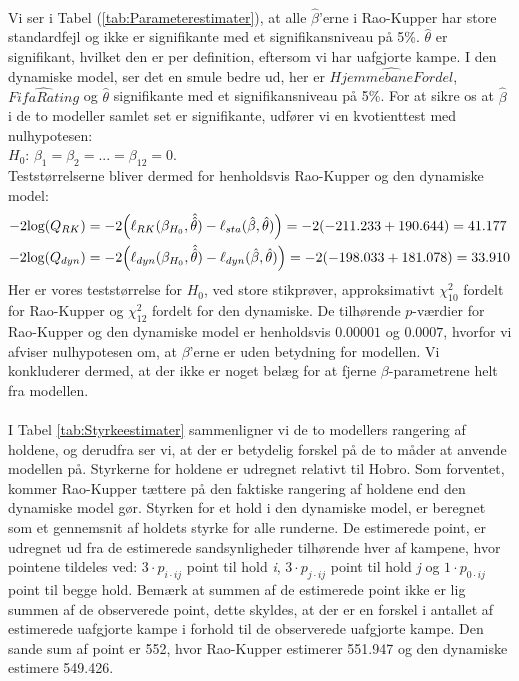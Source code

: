 \documentclass[11pt,a4paper]{article}
\begin{document}
\\Vi ser i Tabel (\ref{tab:Parameterestimater}), at alle $\hat{\beta}$'erne i Rao-Kupper har store standardfejl og ikke er signifikante med et signifikansniveau på 5\%. $\hat{\theta}$ er signifikant, hvilket den er per definition, eftersom vi har uafgjorte kampe. I den dynamiske model, ser det en smule bedre ud, her er $\hat{HjemmebaneFordel}$, $\hat{FifaRating}$ og $\hat{\theta}$ signifikante med et signifikansniveau på 5\%. For at sikre os at $\hat{\beta}$ i de to modeller samlet set er signifikante, udfører vi en kvotienttest med nulhypotesen:\\
$H_0$: $\beta_1=\beta_2=...=\beta_{12} = 0$.\\
Teststørrelserne bliver dermed for henholdsvis Rao-Kupper og den dynamiske model:\\
\begin{align*}
    -2\text{log}(Q_{RK})&=-2\Big{(}\ell_{RK} (\beta_{H_0}, \hat{\hat{\theta}})-\ell_{sta} (\hat{\beta},\hat{\theta})\Big{)}=-2(-211.233+190.644)=41.177\\
    -2\text{log}(Q_{dyn})&=-2\Big{(}\ell_{dyn} (\beta_{H_0},\hat{\hat{\theta}})-\ell_{dyn} (\hat{\beta},\hat{\theta})\Big{)}=-2(-198.033+181.078)=33.910
\end{align*}
Her er vores teststørrelse for $H_0$, ved store stikprøver, approksimativt $\chi^2_{10}$ fordelt for Rao-Kupper og $\chi^2_{12}$ fordelt for den dynamiske. De tilhørende $p$-værdier for Rao-Kupper og den dynamiske model er henholdsvis $0.00001$ og $0.0007$, hvorfor vi afviser nulhypotesen om, at $\beta$'erne er uden betydning for modellen. Vi konkluderer dermed, at der ikke er noget belæg for at fjerne $\beta$-parametrene helt fra modellen.
\\\\I Tabel \ref{tab:Styrkeestimater} sammenligner vi de to modellers rangering af holdene, og derudfra ser vi, at der er betydelig forskel på de to måder at anvende modellen på. Styrkerne for holdene er udregnet relativt til Hobro. Som forventet, kommer Rao-Kupper tættere på den faktiske rangering af holdene end den dynamiske model gør. Styrken for et hold i den dynamiske model, er beregnet som et gennemsnit af holdets styrke for alle runderne. De estimerede point, er udregnet ud fra de estimerede sandsynligheder tilhørende hver af kampene, hvor pointene tildeles ved: $3 \cdot p_{i \cdot ij}$ point til hold \textit{i}, $3\cdot p_{j \cdot ij}$ point til hold \textit{j} og $1\cdot p_{0 \cdot ij}$ point til begge hold. Bemærk at summen af de estimerede point ikke er lig summen af de observerede point, dette skyldes, at der er en forskel i antallet af estimerede uafgjorte kampe i forhold til de observerede uafgjorte kampe. Den sande sum af point er 552, hvor Rao-Kupper estimerer 551.947 og den dynamiske estimere 549.426.
\end{document}

